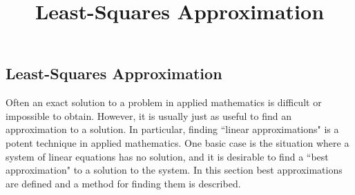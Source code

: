 \documentclass{ximera}
\title{Least-Squares Approximation} \license{CC BY-NC-SA 4.0}
\begin{document}
\begin{abstract}
\end{abstract}
\maketitle

\begin{onlineOnly}
\section*{Least-Squares Approximation}
\end{onlineOnly}

 

Often an exact solution to a problem in applied mathematics is difficult or impossible to obtain. However, it is usually just as useful to find an approximation to a solution. In particular, finding ``linear approximations" is a potent technique in applied mathematics. One basic case is the situation where a system
of linear equations has no solution, and it is desirable to find a ``best approximation" to a solution to the
system. In this section best approximations are defined and a method for finding them is described. 
\end{document}
